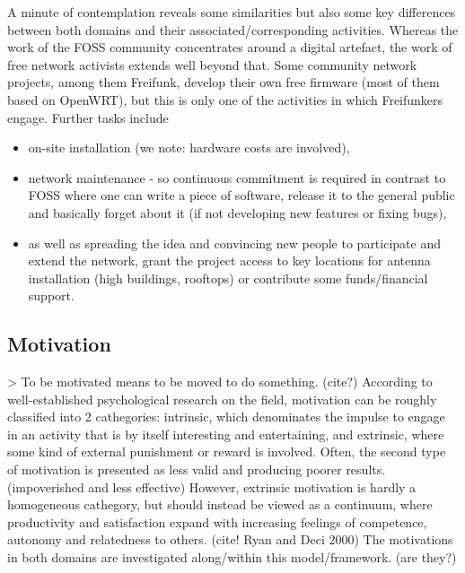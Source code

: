 A minute of contemplation reveals some similarities but also some key differences between both domains and their associated/corresponding activities.
Whereas the work of the FOSS community concentrates around a digital artefact, the work of free network activists extends well beyond that.
Some community network projects, among them Freifunk, develop their own free firmware (most of them based on OpenWRT), but this is only one of the activities in which Freifunkers engage.
Further tasks include
\begin{itemize}
  \item on-site installation (we note: hardware costs are involved),
  \item network maintenance - so continuous commitment is required in contrast to FOSS where one can write a piece of software, release it to the general public and basically forget about it (if not developing new features or fixing bugs),
  \item as well as spreading the idea and convincing new people to participate and extend the network, grant the project access to key locations for antenna installation (high buildings, rooftops) or contribute some funds/financial support.
\end{itemize}

\subsection{Motivation}
> To be motivated means to be moved to do something. (cite?)
According to well-established psychological research on the field, motivation can be roughly classified into 2 cathegories:
intrinsic, which denominates the impulse to engage in an activity that is by itself interesting and entertaining,
and extrinsic, where some kind of external punishment or reward is involved.
Often, the second type of motivation is presented as less valid and producing poorer results. (impoverished and less effective)
However, extrinsic motivation is hardly a homogeneous cathegory, but should instead be viewed as a continuum, where productivity and satisfaction expand with increasing feelings of competence, autonomy and relatedness to others. (cite! Ryan and Deci 2000)
The motivations in both domains are investigated along/within this model/framework. (are they?)

\begin{comment}
What is FOSS (really brief, people should know that)
What is Freifunk (slightly less brief, is the new community) <--- that's the focus

Comparison of the domains:
* FOSS: digital products
* community networks:
  ** digital products (the firmware)
  ** hardware costs
  ** network maintanance
  ** network installation on site
  ** talk to people and convince them of the idea in order to
     *** get access to suitable locations
     *** get funds
     *** convince them to install their own routers and extend the network -- ``marketing'' aspect a way more pronounced

What types of motivation are relevant
\end{comment}

